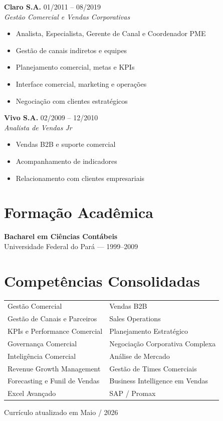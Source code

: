 \documentclass[11pt,a4paper]{article}
\begin{document}
\textbf{Claro S.A.} \hfill {\color{Muted}01/2011 -- 08/2019} \\
\textit{Gestão Comercial e Vendas Corporativas}

\begin{itemize}[leftmargin=1.4em]
\item Analista, Especialista, Gerente de Canal e Coordenador PME
\item Gestão de canais indiretos e equipes
\item Planejamento comercial, metas e KPIs
\item Interface comercial, marketing e operações
\item Negociação com clientes estratégicos
\end{itemize}

\vspace{6pt}

\textbf{Vivo S.A.} \hfill {\color{Muted}02/2009 -- 12/2010} \\
\textit{Analista de Vendas Jr}

\begin{itemize}[leftmargin=1.4em]
\item Vendas B2B e suporte comercial
\item Acompanhamento de indicadores
\item Relacionamento com clientes empresariais
\end{itemize}

\section*{Formação Acadêmica}

\textbf{Bacharel em Ciências Contábeis} \\
Universidade Federal do Pará — 1999–2009

\section*{Competências Consolidadas}

\begin{tabularx}{\linewidth}{X X}
Gestão Comercial & Vendas B2B \\
Gestão de Canais e Parceiros & Sales Operations \\
KPIs e Performance Comercial & Planejamento Estratégico \\
Governança Comercial & Negociação Corporativa Complexa \\
Inteligência Comercial & Análise de Mercado \\
Revenue Growth Management & Gestão de Times Comerciais \\
Forecasting e Funil de Vendas & Business Intelligence em Vendas \\
Excel Avançado & SAP / Promax
\end{tabularx}

\vfill
\begin{center}
{\color{Muted}Currículo atualizado em Maio / 2026}
\end{center}
\end{document}

